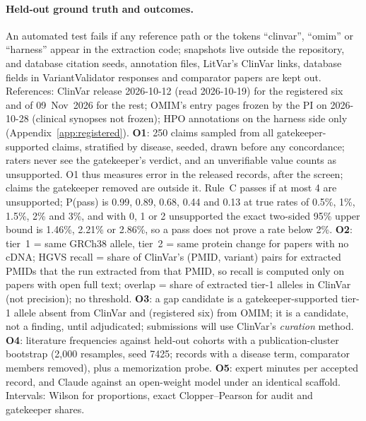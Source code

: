 \documentclass{article} %
\begin{document}
\paragraph{Held-out ground truth and outcomes.} An automated test fails if any reference path or the tokens ``clinvar'', ``omim'' or ``harness'' appear in the extraction code; snapshots live outside the repository, and database citation seeds, annotation files, LitVar's ClinVar links, database fields in VariantValidator responses and comparator papers are kept out. References: ClinVar release 2026-10-12 (read 2026-10-19) for the registered six and of 09~Nov~2026 for the rest; OMIM's entry pages frozen by the PI on 2026-10-28 (clinical synopses not frozen); HPO annotations on the harness side only (Appendix~\ref{app:registered}). \textbf{O1}: 250 claims sampled from all gatekeeper-supported claims, stratified by disease, seeded, drawn before any concordance; raters never see the gatekeeper's verdict, and an unverifiable value counts as unsupported. O1 thus measures error in the released records, after the screen; claims the gatekeeper removed are outside it. Rule~C passes if at most 4 are unsupported; P(pass) is 0.99, 0.89, 0.68, 0.44 and 0.13 at true rates of 0.5\%, 1\%, 1.5\%, 2\% and 3\%, and with 0, 1 or 2 unsupported the exact two-sided 95\% upper bound is 1.46\%, 2.21\% or 2.86\%, so a pass does not prove a rate below 2\%. \textbf{O2}: tier~1 = same GRCh38 allele, tier~2 = same protein change for papers with no cDNA; HGVS recall = share of ClinVar's (PMID, variant) pairs for extracted PMIDs that the run extracted from that PMID, so recall is computed only on papers with open full text; overlap = share of extracted tier-1 alleles in ClinVar (not precision); no threshold. \textbf{O3}: a gap candidate is a gatekeeper-supported tier-1 allele absent from ClinVar and (registered six) from OMIM; it is a candidate, not a finding, until adjudicated; submissions will use ClinVar's \emph{curation} method. \textbf{O4}: literature frequencies against held-out cohorts with a publication-cluster bootstrap \citep{Efron1979BootstrapMethods} (2,000 resamples, seed 7425; records with a disease term, comparator members removed), plus a memorization probe. \textbf{O5}: expert minutes per accepted record, and Claude against an open-weight model under an identical scaffold. Intervals: Wilson \citep{Wilson1927ProbableInference} for proportions, exact Clopper--Pearson \citep{Clopper1934UseConfidence} for audit and gatekeeper shares.
\end{document}
